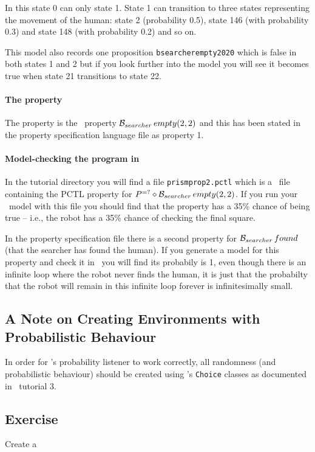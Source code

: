 \documentclass[a4]{article}
\begin{document}
In this state 0 can only state 1.  State 1 can transition to three states representing the movement of the human: state 2 (probability 0.5), state 146 (with probability 0.3) and state 148 (with probability 0.2) and so on.

This model also records one proposition \texttt{bsearcherempty2020} which is false in both states 1 and 2 but if you look further into the model you will see it becomes true when state 21 transitions to state 22.

\paragraph{The property} The property is the \ajpf\ property $\mathrm{{\cal B}}_{searcher} \, empty(2, 2)$ and this has been stated in the property specification language file as property 1. 

\paragraph{Model-checking the program in \prism}  In the tutorial directory you will find a file \texttt{prismprop2.pctl} which is a \prism\ file containing the PCTL property for $P^{=?}\diamond \mathrm{{\cal B}}_{searcher} \, empty(2, 2)$.  If you run your \prism\ model with this file you should find that the property has a 35\% chance of being true -- i.e., the robot has a 35\% chance of checking the final square.

In the property specification file there is a second property for $\mathrm{{\cal B}}_{searcher} \, found$ (that the searcher has found the human).  If you generate a model for this property and check it in \prism\ you will find its probabily is 1, even though there is an infinite loop where the robot never finds the human, it is just that the probabilty that the robot will remain in this infinite loop forever is infinitesimally small.

\subsection{A Note on Creating Environments with Probabilistic Behaviour}

In order for \ajpf's probability listener to work correctly, all randomness (and probabilistic behaviour) should be created using \ail's \texttt{Choice} classes as documented in \ail\ tutorial 3.

\subsection{Exercise}

Create a 


\end{document}
